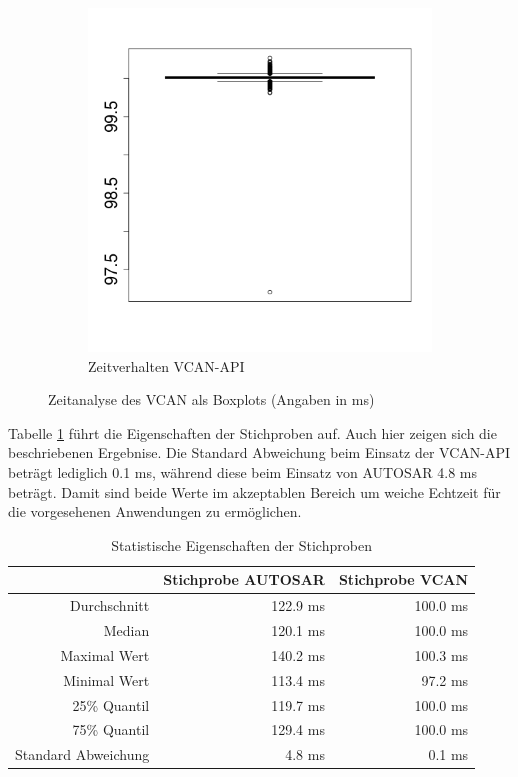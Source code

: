 \documentclass[
  a4paper,					    %
  twoside,
  DIV=calc,     				%
  bibliography=totoc,
  cleardoublepage=empty,
  ngerman,     					%
  final       					%
]{scrbook}
\begin{document}
\begin{figure}
\begin{subfigure}[b]{0.49\textwidth}
        \includegraphics[width=\textwidth]{boxplot_vcan}
        \caption{Zeitverhalten VCAN-API}
        \label{fig:boxplot_vcan}
    \end{subfigure}
    \caption[Zeitanalyse des VCAN als Boxplots]{Zeitanalyse des VCAN als Boxplots (Angaben in ms)}
    \label{fig:timinganalyse}
\end{figure}

Tabelle \ref{tab:jitter_statistik} führt die Eigenschaften der Stichproben auf. Auch hier zeigen sich die beschriebenen Ergebnise. Die Standard Abweichung beim Einsatz der VCAN-API beträgt lediglich 0.1 ms, während diese beim Einsatz von AUTOSAR 4.8 ms beträgt. Damit sind beide Werte im akzeptablen Bereich um weiche Echtzeit für die vorgesehenen Anwendungen zu ermöglichen.

\begin{table}[ht]
    \centering
    \begin{tabular}[h]{r  r r}
            & Stichprobe AUTOSAR & Stichprobe VCAN\\
        \toprule
        Durchschnitt        & 122.9 ms & 100.0 ms\\
        Median              & 120.1 ms & 100.0 ms\\
        Maximal Wert        & 140.2 ms & 100.3 ms\\
        Minimal Wert        & 113.4 ms & 97.2 ms\\
        25\% Quantil        & 119.7 ms & 100.0 ms\\
        75\% Quantil        & 129.4 ms & 100.0 ms\\
        Standard Abweichung & 4.8 ms & 0.1 ms\\
        \bottomrule
    \end{tabular}
    \caption{Statistische Eigenschaften der Stichproben}
    \label{tab:jitter_statistik}
\end{table}
\end{document}
